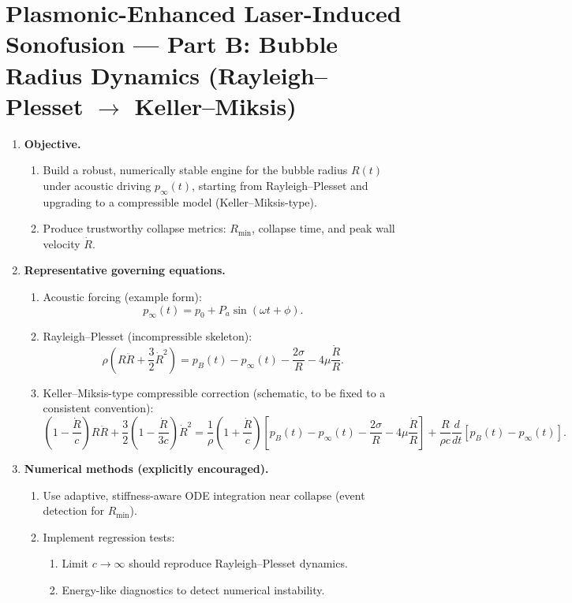 \documentclass[11pt]{article}
\begin{document}
	\section{Plasmonic-Enhanced Laser-Induced Sonofusion --- Part B: Bubble Radius Dynamics (Rayleigh--Plesset $\to$ Keller--Miksis)}
	\begin{enumerate}
		\item \textbf{Objective.}
		\begin{enumerate}
			\item Build a robust, numerically stable engine for the bubble radius $R(t)$ under acoustic driving $p_{\infty}(t)$, starting from Rayleigh--Plesset and upgrading to a compressible model (Keller--Miksis-type).
			\item Produce trustworthy collapse metrics: $R_{\min}$, collapse time, and peak wall velocity $\dot R$.
		\end{enumerate}
		
		\item \textbf{Representative governing equations.}
		\begin{enumerate}
			\item Acoustic forcing (example form):
			\[
			p_{\infty}(t)=p_0 + P_a\sin(\omega t+\phi).
			\]
			
			\item Rayleigh--Plesset (incompressible skeleton):
			\[
			\rho\left(R\ddot R + \dfrac{3}{2}\dot R^2\right)
			=
			p_B(t)-p_{\infty}(t) - \dfrac{2\sigma}{R} - 4\mu\dfrac{\dot R}{R}.
			\]
			
			\item Keller--Miksis-type compressible correction (schematic, to be fixed to a consistent convention):
			\[
			\left(1-\dfrac{\dot R}{c}\right)R\ddot R
			+ \dfrac{3}{2}\left(1-\dfrac{\dot R}{3c}\right)\dot R^2
			=
			\dfrac{1}{\rho}\left(1+\dfrac{\dot R}{c}\right)\left[p_B(t)-p_{\infty}(t)-\dfrac{2\sigma}{R}-4\mu\dfrac{\dot R}{R}\right]
			+ \dfrac{R}{\rho c}\dfrac{d}{dt}\left[p_B(t)-p_{\infty}(t)\right].
			\]
		\end{enumerate}
		
		\item \textbf{Numerical methods (explicitly encouraged).}
		\begin{enumerate}
			\item Use adaptive, stiffness-aware ODE integration near collapse (event detection for $R_{\min}$).
			\item Implement regression tests:
			\begin{enumerate}
				\item Limit $c\to\infty$ should reproduce Rayleigh--Plesset dynamics.
				\item Energy-like diagnostics to detect numerical instability.
			\end{enumerate}
		\end{enumerate}
		

\end{enumerate}
\end{document}

